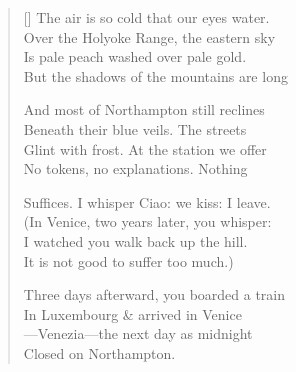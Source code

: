 \label{ch:last_words}
\settowidth{\versewidth}{Suffices.  I whisper Ciao: we kiss: I leave.}
\begin{verse}[\versewidth]
The air is so cold that our eyes water.\\
Over the Holyoke Range, the eastern sky\\
Is pale peach washed over pale gold.\\
But the shadows of the mountains are long

And most of Northampton still reclines\\
Beneath their blue veils.  The streets\\
Glint with frost.  At the station we offer\\
No tokens, no explanations.   Nothing

Suffices.  I whisper Ciao: we kiss: I leave.\\
(In Venice, two years later, you whisper:\\
I watched you walk back up the hill.\\
It is not good to suffer too much.)

Three days afterward, you boarded a train\\
In Luxembourg \& arrived in Venice\\
---Venezia---the next day as midnight\\
     Closed on Northampton.
\end{verse}
